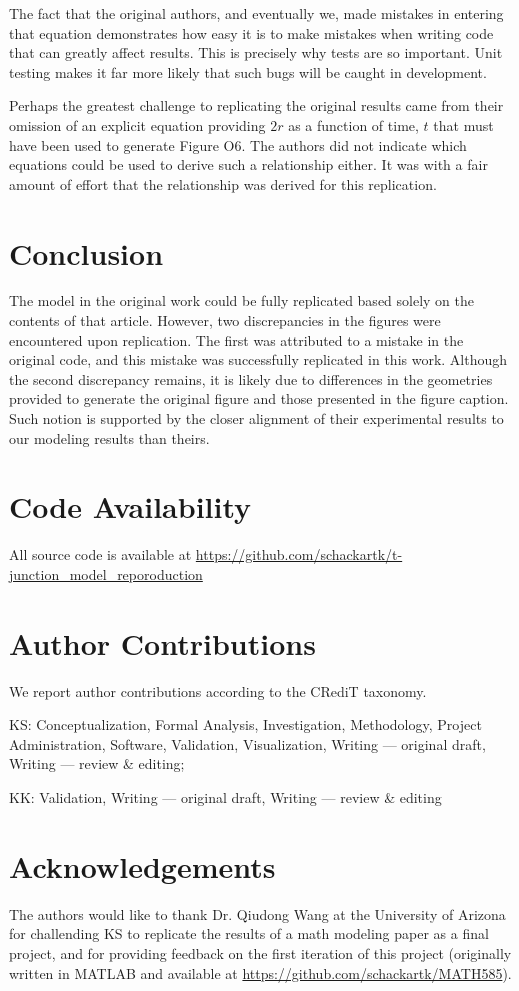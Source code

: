 The fact that the original authors, and eventually we, made mistakes in entering that equation
demonstrates how easy it is to make mistakes when writing code that can greatly affect results.
This is precisely why tests are so important. Unit testing makes it far more likely that
such bugs will be caught in development.

Perhaps the greatest challenge to replicating the original results came from their
omission of an explicit equation providing $2r$ as a function of time, $t$ that must have been
used to generate Figure O6. The authors did not indicate which equations could be used to
derive such a relationship either. It was with a fair amount of effort that the relationship
was derived for this replication.

\section{Conclusion}

The model in the original work could be fully replicated based solely on the contents of
that article. However, two discrepancies in the figures were encountered upon replication.
The first was attributed to a mistake in the original code, and this mistake was successfully
replicated in this work. Although the second discrepancy remains, it is likely due to differences
in the geometries provided to generate the original figure and those presented in the figure caption.
Such notion is supported by the closer alignment of their experimental results to our modeling results
than theirs.

\section{Code Availability}

All source code is available at \url{https://github.com/schackartk/t-junction_model_reporoduction}

\section{Author Contributions}

We report author contributions according to the CRediT taxonomy\supercite{allen_how_2019}.

KS: Conceptualization, Formal Analysis, Investigation, Methodology,
Project Administration, Software, Validation, Visualization, Writing — original draft,
Writing — review \& editing;

KK: Validation, Writing — original draft, Writing — review \& editing

\section{Acknowledgements}

The authors would like to thank Dr. Qiudong Wang at the University of Arizona for
challending KS to replicate the results of a math modeling paper as a final project, and
for providing feedback on the first iteration of this project (originally written
in MATLAB and available at \url{https://github.com/schackartk/MATH585}).



